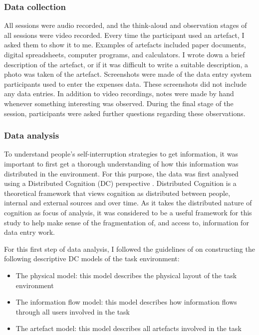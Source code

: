 \subsubsection{Data collection}
All sessions were audio recorded, and the think-aloud and observation stages of all sessions were video recorded. Every time the participant used an artefact, I asked them to show it to me. Examples of artefacts included paper documents, digital spreadsheets, computer programs, and calculators. I wrote down a brief description of the artefact, or if it was difficult to write a suitable description, a photo was taken of the artefact. Screenshots were made of the data entry system participants used to enter the expenses data. These screenshots did not include any data entries. In addition to video recordings, notes were made by hand whenever something interesting was observed. During the final stage of the session, participants were asked further questions regarding these observations.

\subsubsection{Data analysis}
To understand people’s self-interruption strategies to get information, it was important to first get a thorough understanding of how this information was distributed in the environment. For this purpose, the data was first analysed using a Distributed Cognition (DC) perspective \citep{Hutchins1995}. Distributed Cognition is a theoretical framework that views cognition as distributed between people, internal and external sources and over time. As it takes the distributed nature of cognition as focus of analysis, it was considered to be a useful framework for this study to help make sense of the fragmentation of, and access to, information for data entry work. 

For this first step of data analysis, I followed the guidelines of \citet{Furniss2006} on constructing the following descriptive DC models of the task environment:

\begin{itemize}
\item 
The physical model: this model describes the physical layout of the task environment
\item 
The information flow model: this model describes how information flows through all users involved in the task
\item 
The artefact model: this model describes all artefacts involved in the task
\end{itemize}

